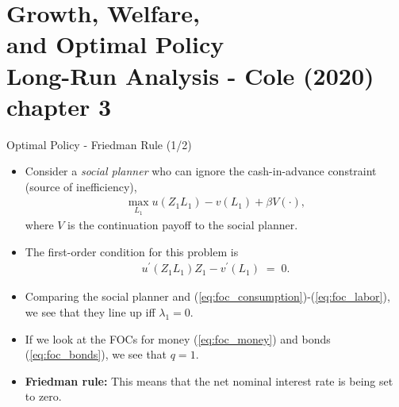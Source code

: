\documentclass[10pt,c,aspectratio=1610,handout]{beamer}
\begin{document}
\section{Growth, Welfare,\\and Optimal Policy\\\small{Long-Run Analysis - Cole (2020) chapter 3}}%
\begin{frame}{Optimal Policy - Friedman Rule (1/2)}%
  \begin{itemize}%
    \item[$\blacktriangleright$] Consider a \emph{social planner} who can ignore the cash-in-advance constraint {\small (source of inefficiency)},%
    \begin{align*}%
      \max_{L_{1}} u(Z_{1} L_{1}) - v(L_{1}) + \beta V(\cdot),%
    \end{align*}%
    where $V$ is the continuation payoff to the social planner.%
    \vspace*{0.2in}%
    \pause%
    \item[$\blacktriangleright$] The first-order condition for this problem is%
    \begin{align*}%
      u^{\prime} (Z_{1} L_{1}) Z_{1} - v^{\prime} (L_{1}) \; = \; 0.%
    \end{align*}%
    \pause%
    \item[$\blacktriangleright$] Comparing the social planner and (\ref{eq:foc_consumption})-(\ref{eq:foc_labor}), we see that they line up iff $\lambda _{1}=0.$%
    \item[$\blacktriangleright$] If we look at the FOCs for money (\ref{eq:foc_money}) and bonds (\ref{eq:foc_bonds}), we see that $q = 1$.%
    \vspace*{0.1in}%
    \pause%
    \item[$\Rightarrow$] \textbf{Friedman rule:} This means that the net nominal interest rate is being set to zero.%
  \end{itemize}%
\end{frame}%
\end{document}
